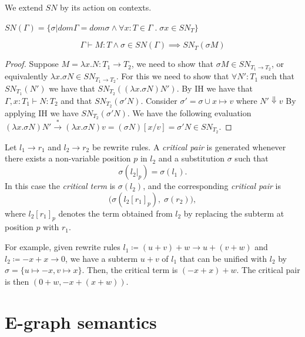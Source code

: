 \documentclass[acmsmall,screen, nonacm, anonymous]{acmart}
\begin{document}
We extend $SN$ by its action on contexts.

\begin{definition}
  $SN(\Gamma) = \{\sigma | dom \Gamma = dom \sigma \land \forall x : T \in \Gamma\;.\; \sigma x \in SN_{T} \}$
\end{definition}

\begin{lemma}
\[
\Gamma \vdash M : T \land \sigma \in SN(\Gamma) \implies SN_{T}(\sigma M)
\]
\end{lemma}
\begin{proof}
  Suppose $M = \lambda x . N : T_1 \to T_2$, we need to show that $\sigma M \in SN_{T_1 \to T_2}$, or equivalently $\lambda x . \sigma N \in SN_{T_1 \to T_2}$.
  For this we need to show that $\forall N' : T_1$ such that $SN_{T_1}(N')$ we have that $SN_{T_2}((\lambda x . \sigma N)N')$.
  By IH we have that $\Gamma, x : T_1 \vdash N : T_2$ and that $SN_{T_2}(\sigma' N)$.
  Consider $\sigma' = \sigma \cup x \mapsto v$ where $N' \Downarrow v$
  By applying IH we have $SN_{T_{2}}(\sigma' N)$.
  We have the following evaluation $(\lambda x . \sigma N)N' \xrightarrow{*} (\lambda x . \sigma N)v = (\sigma N)[x / v] = \sigma' N \in SN_{T_2}$.
\end{proof}

\begin{definition}
  Let $l_1 \to r_1$ and $l_2 \to r_2$ be rewrite rules.
  A \emph{critical pair} is generated whenever there exists a
  non-variable position $p$ in $l_2$ and a substitution $\sigma$
  such that
  \[
    \sigma(l_2|_p) = \sigma(l_1).
  \]
  In this case the \emph{critical term} is $\sigma(l_2)$, and the
  corresponding \emph{critical pair} is
  \[
    \bigl( \sigma(l_2[r_1]_p),\; \sigma(r_2) \bigr),
  \]
  where $l_2[r_1]_p$ denotes the term obtained from $l_2$ by replacing
  the subterm at position $p$ with $r_1$.
\end{definition}

For example, given rewrite rules $l_1 \coloneq (u + v) + w \to u + (v + w)$ and $l_2 \coloneq -x + x \to 0$, we have a subterm $u + v$ of $l_1$ that can be unified with $l_2$ by $\sigma = \{u \mapsto -x, v \mapsto x\}$.
Then, the critical term is $(-x + x) + w$. The critical pair is then $(0 + w,-x + (x + w))$.

\section{E-graph semantics}
\end{document}

